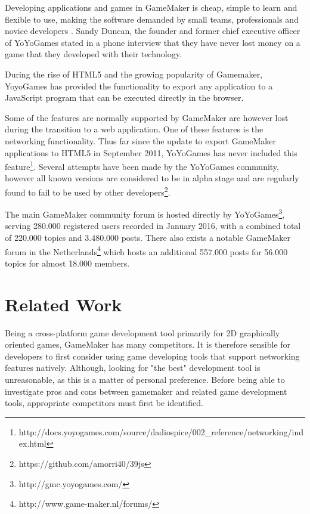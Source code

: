 \documentclass[bsc,frontabs,twoside,singlespacing,parskip,deptreport]{infthesis}     %
\begin{document}
Developing applications and games in GameMaker is cheap, simple to learn and flexible to use, making the software demanded by small teams, professionals and novice developers \cite{Mark_Overmars}. Sandy Duncan, the founder and former chief executive officer of YoYoGames stated in a phone interview that they have never lost money on a game that they developed with their technology\cite{Gamemaker_DnD}.

During the rise of HTML5 and the growing popularity of Gamemaker, YoyoGames has provided the functionality to export any application to a JavaScript program that can be executed directly in the browser\cite{GameMaker_Studio}.

Some of the features are normally supported by GameMaker are however lost during the transition to a web application. One of these features is the networking functionality. Thus far since the update to export GameMaker applications to HTML5 in September 2011, YoYoGames has never included this feature\footnote{http://docs.yoyogames.com/source/dadiospice/002\_reference/networking/index.html}. Several attempts have been made by the YoYoGames community, however all known versions are considered to be in alpha stage and are regularly found to fail to be used by other developers\footnote{https://github.com/amorri40/39js}. %

The main GameMaker community forum is hosted directly by YoYoGames\footnote{http://gmc.yoyogames.com/}, serving 280.000 registered users recorded in January 2016, with a combined total of 220.000 topics and 3.480.000 posts. There also exists a notable GameMaker forum in the Netherlands\footnote{http://www.game-maker.nl/forums/} which hosts an additional 557.000 posts for 56.000 topics for almost 18.000 members.

\section{Related Work}
Being a cross-platform game development tool primarily for 2D graphically oriented games, GameMaker has many competitors. It is therefore sensible for developers to first consider using game developing tools that support networking features natively. Although, looking for "the best" development tool is unreasonable, as this is a matter of personal preference. Before being able to investigate pros and cons between gamemaker and related game development tools, appropriate competitors must first be identified.
\end{document}
